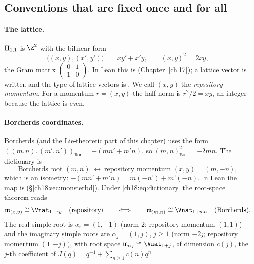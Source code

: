 \subsection{Conventions that are fixed once and for all}\label{ch18:sec:conventions}

\paragraph{The lattice.}  $\mathrm{II}_{1,1}$ is $\Z^2$ with the bilinear form
\begin{equation}\label{ch18:eq:repform}
  \bigl((x,y),(x',y')\bigr) \;=\; xy'+x'y,\qquad (x,y)^2=2xy,
\end{equation}
the Gram matrix $\left(\begin{smallmatrix}0&1\\1&0\end{smallmatrix}\right)$.  In Lean this is
 (Chapter~\ref{ch:17}); a lattice vector is written \lean{![x, y]} and the
type of lattice vectors is .  We call $(x,y)$ the \emph{repository
momentum}.  For a momentum $r=(x,y)$ the half-norm is $r^2/2=xy$, an integer because the lattice is
even.

\paragraph{Borcherds coordinates.}  Borcherds (and the Lie-theoretic part of this chapter) uses the
form $((m,n),(m',n'))_{\mathrm{Bor}}=-(mn'+m'n)$, so $(m,n)^2_{\mathrm{Bor}}=-2mn$.  The dictionary is
\begin{equation}\label{ch18:eq:dictionary}
  \text{Borcherds root }(m,n)\;\longleftrightarrow\;\text{repository momentum }(x,y)=(m,-n),
\end{equation}
which is an isometry: $-(mn'+m'n)=m(-n')+m'(-n)$.  In Lean the map is 
(\S\ref{ch18:sec:monsterbd}).  Under \eqref{ch18:eq:dictionary} the root-space theorem reads
\begin{equation*}
  \chXVIIIm_{(x,y)}\cong\Vnat_{1-xy}\quad\text{(repository)}\qquad\Longleftrightarrow\qquad
  \chXVIIIm_{(m,n)}\cong\Vnat_{1+mn}\quad\text{(Borcherds)}.
\end{equation*}
The real simple root is $\alpha_r=(1,-1)$ (norm $2$; repository momentum $(1,1)$) and the imaginary
simple roots are $\alpha_j=(1,j)$, $j\ge1$ (norm $-2j$; repository momentum $(1,-j)$), with root
space $\chXVIIIm_{\alpha_j}\cong\Vnat_{1+j}$, of dimension $c(j)$, the $j$-th coefficient of
$J(q)=q^{-1}+\sum_{n\ge1}c(n)q^n$.

